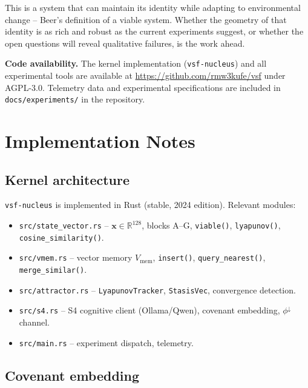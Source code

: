 \documentclass[11pt, a4paper]{article}
\newcommand{\R}{\mathbb{R}}
\newcommand{\sv}{\bm{x}}
\newcommand{\nucleus}{\texttt{vsf-nucleus}}
\begin{document}
This is a system that can maintain its identity while adapting to
environmental change -- Beer's definition of a viable system.
Whether the geometry of that identity is as rich and robust as the
current experiments suggest, or whether the open questions will reveal
qualitative failures, is the work ahead.

\bigskip
\noindent\textbf{Code availability.}
The kernel implementation (\nucleus{}) and all experimental tools are
available at \url{https://github.com/rmw3kufe/vsf} under AGPL-3.0.
Telemetry data and experimental specifications are included in
\texttt{docs/experiments/} in the repository.






\appendix

\section{Implementation Notes}
\label{app:impl}

\subsection{Kernel architecture}

\nucleus{} is implemented in Rust (stable, 2024 edition).
Relevant modules:
\begin{itemize}
  \item \texttt{src/state\_vector.rs} -- $\sv \in \R^{128}$, blocks A--G,
        \texttt{viable()}, \texttt{lyapunov()}, \texttt{cosine\_similarity()}.
  \item \texttt{src/vmem.rs} -- vector memory $V_\text{mem}$,
        \texttt{insert()}, \texttt{query\_nearest()}, \texttt{merge\_similar()}.
  \item \texttt{src/attractor.rs} -- \texttt{LyapunovTracker},
        \texttt{StasisVec}, convergence detection.
  \item \texttt{src/s4.rs} -- S4 cognitive client (Ollama/Qwen),
        covenant embedding, $\phi^\downarrow$ channel.
  \item \texttt{src/main.rs} -- experiment dispatch, telemetry.
\end{itemize}

\subsection{Covenant embedding}
\end{document}
